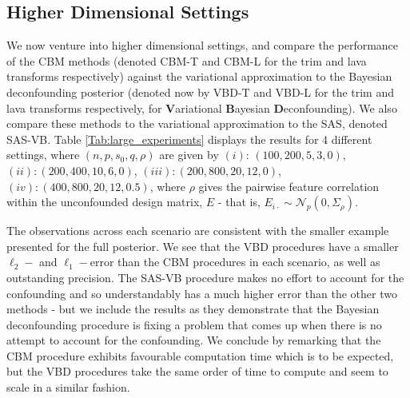 \documentclass[11pt]{article}
\newcommand{\N}{\mathcal{N}}
\numberwithin{equation}{section}
\begin{document}
\subsection{Higher Dimensional Settings}
We now venture into higher dimensional settings, and compare the performance of the CBM methods (denoted CBM-T and CBM-L for the trim and lava transforms respectively) against the variational approximation to the Bayesian deconfounding posterior (denoted now by VBD-T and VBD-L for the trim and lava transforms respectively, for {\bf V}ariational {\bf B}ayesian {\bf D}econfounding). We also compare these methods to the variational approximation to the SAS, denoted SAS-VB.
Table \ref{Tab:large_experiments} displays the results for 4 different settings, where $(n, p, s_0, q, \rho) $ are given by $(i)$: $(100, 200, 5, 3, 0)$, $(ii): (200, 400, 10, 6, 0)$, $(iii): (200, 800, 20, 12, 0)$, $(iv): (400, 800, 20, 12, 0.5)$, where $\rho$ gives the pairwise feature correlation within the unconfounded design matrix, $E$ - that is, $E_{i \cdot} \sim \N_p(0, \Sigma_\rho)$.

The observations across each scenario are consistent with the smaller example presented for the full posterior. We see that the VBD procedures have a smaller $\ell_2-$ and $\ell_1-$error than the CBM procedures in each scenario, as well as outstanding precision. The SAS-VB procedure makes no effort to account for the confounding and so understandably has a much higher error than the other two methods - but we include the results as they demonstrate that the Bayesian deconfounding procedure is fixing a problem that comes up when there is no attempt to account for the confounding. We conclude by remarking that the CBM procedure exhibits favourable computation time which is to be expected, but the VBD procedures take the same order of time to compute and seem to scale in a similar fashion.
\end{document}
